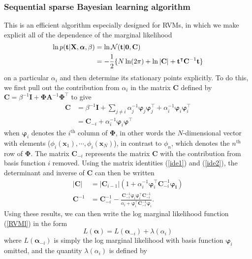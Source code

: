 \documentclass[a4paper]{report}
\newcommand{\up}{\mathrm}
\renewcommand{\bf}{\mathbf}
\renewcommand{\cal}{\mathcal}
\newcommand{\bs}{\boldsymbol}
\begin{document}
\subsubsection{Sequential sparse Bayesian learning algorithm} \label{SSBL}
This is an efficient algorithm especially designed for RVMs, in which we make explicit all of the dependence of the marginal likelihood
\begin{align}
	\ln p(\bf{t}|\bf{X},\bs{\alpha},\beta) &= \ln \cal{N}(\bf{t}|\bf{0,C})\notag\\
	&= -\frac{1}{2} \{ N \ln(2\pi) + \ln |\bf{C}| + \bf{t}^{\intercal}\bf{C}^{-1}\bf{t} \} \label{RVMl}
\end{align}
on a particular $\alpha_i$ and then determine its stationary points explicitly. To do this, we first pull out the contribution from $\alpha_i$ in the matrix $\bf{C}$ defined by $\bf{C} = \beta^{-1} \bf{I}+\bf{\Phi}\bf{A}^{-1}\bf{\Phi}^{\intercal}$ to give
\begin{align}
	\bf{C} &= \beta^{-1} \bf{I} + \sum_{j \neq i} \alpha_j^{-1} \bs{\varphi}_j \bs{\varphi}_j^{\intercal} + \alpha_i^{-1} \bs{\varphi}_i \bs{\varphi}_i^{\intercal}\\
	&= \bf{C}_{-i} + \alpha_i^{-1} \bs{\varphi}_i \bs{\varphi}^{\intercal}
\end{align}
when $\bs{\varphi}_i$ denotes the $i^{\up{th}}$ column of $\bs{\Phi}$, in other words the $N$-dimensional vector with elements ($\phi_i(\bf{x}_1),\cdots,\phi_i(\bf{x}_N)$), in contrast to $\phi_n$, which denotes the $n^{\up{th}}$ row of $\bf{\Phi}$. The matrix $\bf{C}_{-i}$ represents the matrix $\bf{C}$ with the contribution from basis function $i$ removed. Using the matrix identities (\ref{ide1}) and (\ref{ide2}), the determinant and inverse of $\bf{C}$ can then be written
\begin{align}
	|\bf{C}| &= |\bf{C}_{i-1}|(1+\alpha_i^{-1}\bs{\varphi}_i^{\intercal}\bf{C}_{-i}^{-1}\bs{\varphi_i})\\
	\bf{C}^{-1} &= \bf{C}_{-i}^{-1} - \frac{\bf{C}_{-i}^{-1}\bs{\varphi}_i \bs{\varphi}_i^{\intercal}\bf{C}_{-i}^{-1}}{\alpha_i+\bs{\varphi}_i^{\intercal}\bf{C}_{-i}^{-1}\bs{\varphi}_i}.
\end{align}
Using these results, we can then write the log marginal likelihood function (\ref{RVMl}) in the form
\begin{equation}
	L(\bs{\alpha}) = L(\bs{\alpha}_{-i})+\lambda(\alpha_i)
\end{equation}
where $L(\bs{\alpha}_{-i})$ is simply the log marginal likelihood with basis function $\bs{\varphi}_i$ omitted, and the quantity $\lambda(\alpha_i)$ is defined by
\end{document}

